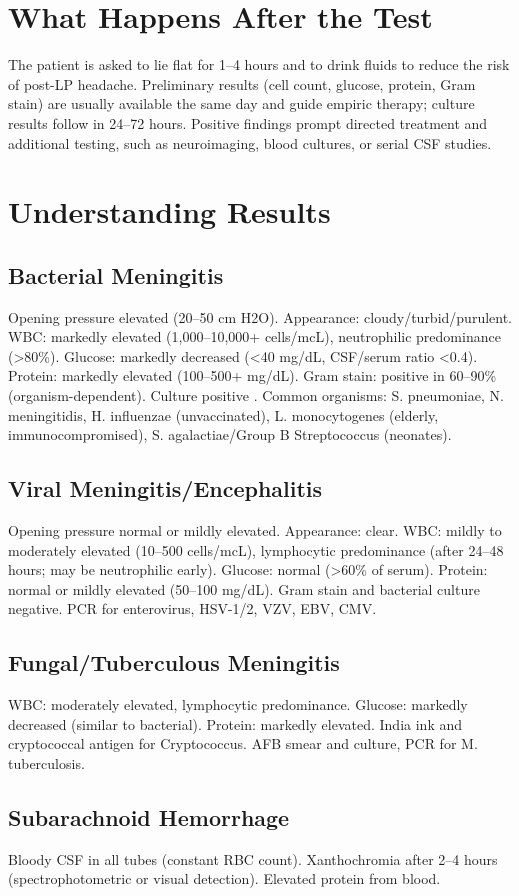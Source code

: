 \section*{What Happens After the Test}
The patient is asked to lie flat for 1--4 hours and to drink fluids to reduce the risk of post-LP headache. Preliminary results (cell count, glucose, protein, Gram stain) are usually available the same day and guide empiric therapy; culture results follow in 24--72 hours. Positive findings prompt directed treatment and additional testing, such as neuroimaging, blood cultures, or serial CSF studies.
\section*{Understanding Results}
\subsection*{Bacterial Meningitis}
Opening pressure elevated (20--50 cm H2O). Appearance: cloudy/turbid/purulent. WBC: markedly elevated (1,000--10,000+ cells/mcL), neutrophilic predominance (>80\%). Glucose: markedly decreased (<40 mg/dL, CSF/serum ratio <0.4). Protein: markedly elevated (100--500+ mg/dL). Gram stain: positive in 60--90\% (organism-dependent). Culture positive \cite{vandebeek2004clinical}. Common organisms: S. pneumoniae, N. meningitidis, H. influenzae (unvaccinated), L. monocytogenes (elderly, immunocompromised), S. agalactiae/Group B Streptococcus (neonates).
\subsection*{Viral Meningitis/Encephalitis}
Opening pressure normal or mildly elevated. Appearance: clear. WBC: mildly to moderately elevated (10--500 cells/mcL), lymphocytic predominance (after 24--48 hours; may be neutrophilic early). Glucose: normal (>60\% of serum). Protein: normal or mildly elevated (50--100 mg/dL). Gram stain and bacterial culture negative. PCR for enterovirus, HSV-1/2, VZV, EBV, CMV.
\subsection*{Fungal/Tuberculous Meningitis}
WBC: moderately elevated, lymphocytic predominance. Glucose: markedly decreased (similar to bacterial). Protein: markedly elevated. India ink and cryptococcal antigen for Cryptococcus. AFB smear and culture, PCR for M. tuberculosis.
\subsection*{Subarachnoid Hemorrhage}
Bloody CSF in all tubes (constant RBC count). Xanthochromia after 2--4 hours (spectrophotometric or visual detection). Elevated protein from blood.
